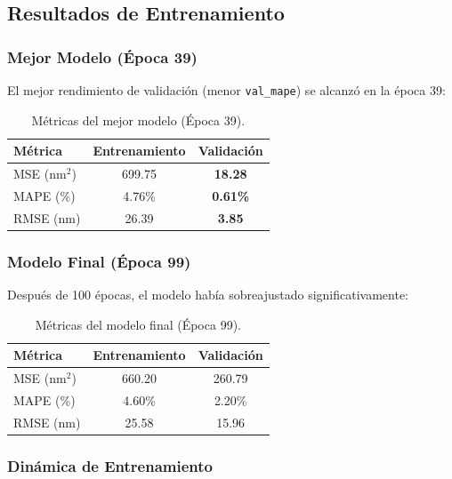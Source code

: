 \documentclass{article}
\begin{document}
\subsection{Resultados de Entrenamiento}

\subsubsection{Mejor Modelo (Época 39)}
El mejor rendimiento de validación (menor \texttt{val\_mape}) se alcanzó en la época 39:

\begin{table}[htbp]
\centering
\caption{Métricas del mejor modelo (Época 39).}
\label{tab:best-model}
\begin{tabular}{lcc}
\hline
Métrica & Entrenamiento & Validación \\
\hline
MSE (nm$^2$) & 699.75 & \textbf{18.28} \\
MAPE (\%)    & 4.76\% & \textbf{0.61\%} \\
RMSE (nm)    & 26.39  & \textbf{3.85} \\
\hline
\end{tabular}
\end{table}

\subsubsection{Modelo Final (Época 99)}
Después de 100 épocas, el modelo había sobreajustado significativamente:

\begin{table}[htbp]
\centering
\caption{Métricas del modelo final (Época 99).}
\label{tab:final-model}
\begin{tabular}{lcc}
\hline
Métrica & Entrenamiento & Validación \\
\hline
MSE (nm$^2$) & 660.20 & 260.79 \\
MAPE (\%)    & 4.60\% & 2.20\% \\
RMSE (nm)    & 25.58  & 15.96 \\
\hline
\end{tabular}
\end{table}

\subsubsection{Dinámica de Entrenamiento}
\end{document}
